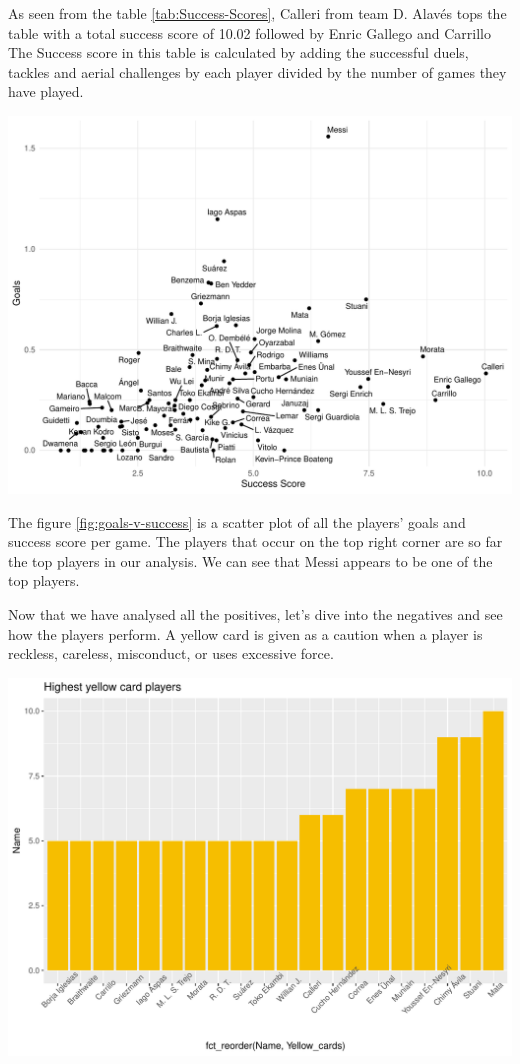 \documentclass[11pt,a4paper,]{article}
\let\origfigure\figure
\let\endorigfigure\endfigure
\renewenvironment{figure}[1][2] {
    \expandafter\origfigure\expandafter[H]
} {
    \endorigfigure
}
\begin{document}
As seen from the table \ref{tab:Success-Scores}, Calleri from team D. Alavés tops the table with a total success score of 10.02 followed by Enric Gallego and Carrillo The Success score in this table is calculated by adding the successful duels, tackles and aerial challenges by each player divided by the number of games they have played.

\begin{figure}[H]

{\centering \includegraphics[width=0.8\linewidth]{Assignment-4-ETC5513_files/figure-latex/goals-v-success-1} 

}

\caption{Goals vs Success score}\label{fig:goals-v-success}
\end{figure}

The figure \ref{fig:goals-v-success} is a scatter plot of all the players' goals and success score per game. The players that occur on the top right corner are so far the top players in our analysis. We can see that Messi appears to be one of the top players.

Now that we have analysed all the positives, let's dive into the negatives and see how the players perform. A yellow card is given as a caution when a player is reckless, careless, misconduct, or uses excessive force.

\begin{figure}[H]

{\centering \includegraphics[width=0.8\linewidth]{Assignment-4-ETC5513_files/figure-latex/Yellow-cards-1} 

}

\caption{Top 20 yellow card players}\label{fig:Yellow-cards}
\end{figure}
\end{document}
